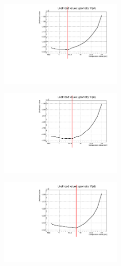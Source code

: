 \documentclass[a4paper, 11pt]{report}
\begin{document}
\begin{figure}[htbp]
\begin{minipage}[b]{.32\textwidth}
\includegraphics[width=6cm, height=4.6cm]{figs/likelihood100LowStat/likelihood17p4.pdf}
\end{minipage}\hfill
\begin{minipage}[b]{.32\textwidth}
\includegraphics[width=6cm, height=4.6cm]{figs/likelihood100LowStat/likelihood17p6.pdf}
\end{minipage} \hfill
\begin{minipage}[b]{.32\textwidth}
\includegraphics[width=6cm, height=4.6cm]{figs/likelihood100LowStat/likelihood17p8.pdf}
\end{minipage} \hfill \vspace{10pt}


\end{figure}
\end{document}
